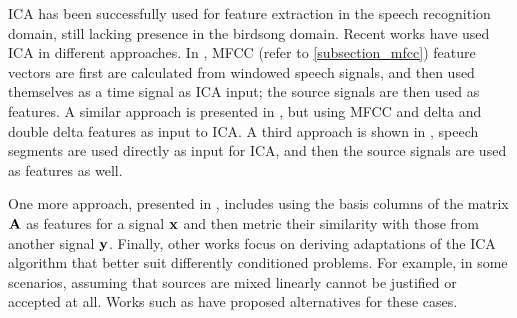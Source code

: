 \documentclass[../main.tex]{subfiles} \label{chapter_soa}
\begin{document}
\par ICA has been successfully used for feature extraction in the speech recognition domain, still lacking presence in the birdsong domain. Recent works have used ICA in different approaches. In \cite{Kasprzak}, MFCC (refer to \ref{subsection_mfcc}) feature vectors are first are calculated from windowed speech signals, and then used themselves as a time signal as ICA input; the source signals are then used as features. A similar approach is presented in \cite{Hsieh2009}, but using MFCC and delta and double delta features as input to ICA. A third approach is shown in \cite{Lee2000}, speech segments are used directly as input for ICA, and then the source signals are used as features as well.
\par One more approach, presented in \cite{Jang2001}, includes using the basis columns of the matrix $\mathbf{A}$ as features for a signal $\mathbf{x}$ and then metric their similarity with those from another signal $\mathbf{y}$. Finally, other works focus on deriving adaptations of the ICA algorithm that better suit differently conditioned problems. For example, in some scenarios, assuming that sources are mixed linearly cannot be justified or accepted at all. Works such as \cite{Almeida2003, Omar} have proposed alternatives for these cases.
\end{document}
